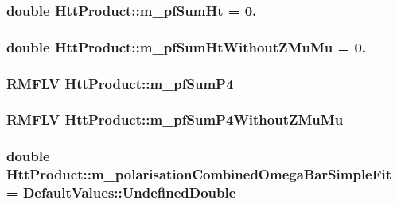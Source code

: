 \label{classHttProduct_ac875645551f9928222a8f22f2487b444}
\hypertarget{classHttProduct_acc65cd96f1114a8c00337ce3b57ea03b}{
\subsubsection[{m\_\-pfSumHt}]{\setlength{\rightskip}{0pt plus 5cm}double {\bf HttProduct::m\_\-pfSumHt} = 0.}}
\label{classHttProduct_acc65cd96f1114a8c00337ce3b57ea03b}
\hypertarget{classHttProduct_ad0bfad9592c131371736c14e9ed16e71}{
\subsubsection[{m\_\-pfSumHtWithoutZMuMu}]{\setlength{\rightskip}{0pt plus 5cm}double {\bf HttProduct::m\_\-pfSumHtWithoutZMuMu} = 0.}}
\label{classHttProduct_ad0bfad9592c131371736c14e9ed16e71}
\hypertarget{classHttProduct_a7ead93647a4958c65f8bb84c689ea0b5}{
\subsubsection[{m\_\-pfSumP4}]{\setlength{\rightskip}{0pt plus 5cm}RMFLV {\bf HttProduct::m\_\-pfSumP4}}}
\label{classHttProduct_a7ead93647a4958c65f8bb84c689ea0b5}
\hypertarget{classHttProduct_a8304bb2e0d778a235a427993641ed25f}{
\subsubsection[{m\_\-pfSumP4WithoutZMuMu}]{\setlength{\rightskip}{0pt plus 5cm}RMFLV {\bf HttProduct::m\_\-pfSumP4WithoutZMuMu}}}
\label{classHttProduct_a8304bb2e0d778a235a427993641ed25f}
\hypertarget{classHttProduct_a9dfb25a74bfaf26ad2c4da1fee5f7572}{
\subsubsection[{m\_\-polarisationCombinedOmegaBarSimpleFit}]{\setlength{\rightskip}{0pt plus 5cm}double {\bf HttProduct::m\_\-polarisationCombinedOmegaBarSimpleFit} = DefaultValues::UndefinedDouble}}
